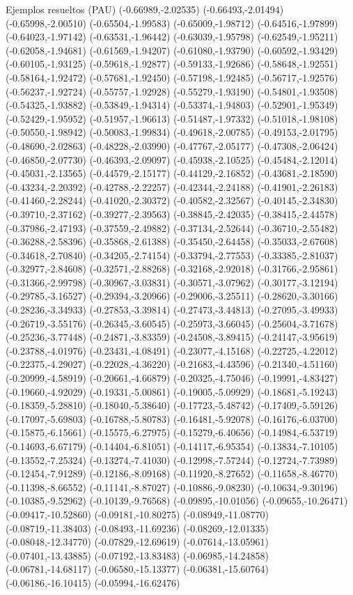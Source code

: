 \documentclass[11pt,a4paper]{article}
\begin{document}
\begin{fmex}{Ejemplos resueltos (PAU)}
(-0.66989,-2.02535) (-0.66493,-2.01494) (-0.65998,-2.00510) (-0.65504,-1.99583) (-0.65009,-1.98712) (-0.64516,-1.97899) (-0.64023,-1.97142) (-0.63531,-1.96442) (-0.63039,-1.95798) (-0.62549,-1.95211) (-0.62058,-1.94681) (-0.61569,-1.94207) (-0.61080,-1.93790) (-0.60592,-1.93429) (-0.60105,-1.93125) (-0.59618,-1.92877) (-0.59133,-1.92686) (-0.58648,-1.92551) (-0.58164,-1.92472) (-0.57681,-1.92450) (-0.57198,-1.92485) (-0.56717,-1.92576) (-0.56237,-1.92724) (-0.55757,-1.92928) (-0.55279,-1.93190) (-0.54801,-1.93508) (-0.54325,-1.93882) (-0.53849,-1.94314) (-0.53374,-1.94803) (-0.52901,-1.95349) (-0.52429,-1.95952) (-0.51957,-1.96613) (-0.51487,-1.97332) (-0.51018,-1.98108) (-0.50550,-1.98942) (-0.50083,-1.99834) (-0.49618,-2.00785) (-0.49153,-2.01795) (-0.48690,-2.02863) (-0.48228,-2.03990) (-0.47767,-2.05177) (-0.47308,-2.06424) (-0.46850,-2.07730) (-0.46393,-2.09097) (-0.45938,-2.10525) (-0.45484,-2.12014) (-0.45031,-2.13565) (-0.44579,-2.15177) (-0.44129,-2.16852) (-0.43681,-2.18590) (-0.43234,-2.20392) (-0.42788,-2.22257) (-0.42344,-2.24188) (-0.41901,-2.26183) (-0.41460,-2.28244) (-0.41020,-2.30372) (-0.40582,-2.32567) (-0.40145,-2.34830) (-0.39710,-2.37162) (-0.39277,-2.39563) (-0.38845,-2.42035) (-0.38415,-2.44578) (-0.37986,-2.47193) (-0.37559,-2.49882) (-0.37134,-2.52644) (-0.36710,-2.55482) (-0.36288,-2.58396) (-0.35868,-2.61388) (-0.35450,-2.64458) (-0.35033,-2.67608) (-0.34618,-2.70840) (-0.34205,-2.74154) (-0.33794,-2.77553) (-0.33385,-2.81037) (-0.32977,-2.84608) (-0.32571,-2.88268) (-0.32168,-2.92018) (-0.31766,-2.95861) (-0.31366,-2.99798) (-0.30967,-3.03831) (-0.30571,-3.07962) (-0.30177,-3.12194) (-0.29785,-3.16527) (-0.29394,-3.20966) (-0.29006,-3.25511) (-0.28620,-3.30166) (-0.28236,-3.34933) (-0.27853,-3.39814) (-0.27473,-3.44813) (-0.27095,-3.49933) (-0.26719,-3.55176) (-0.26345,-3.60545) (-0.25973,-3.66045) (-0.25604,-3.71678) (-0.25236,-3.77448) (-0.24871,-3.83359) (-0.24508,-3.89415) (-0.24147,-3.95619) (-0.23788,-4.01976) (-0.23431,-4.08491) (-0.23077,-4.15168) (-0.22725,-4.22012) (-0.22375,-4.29027) (-0.22028,-4.36220) (-0.21683,-4.43596) (-0.21340,-4.51160) (-0.20999,-4.58919) (-0.20661,-4.66879) (-0.20325,-4.75046) (-0.19991,-4.83427) (-0.19660,-4.92029) (-0.19331,-5.00861) (-0.19005,-5.09929) (-0.18681,-5.19243) (-0.18359,-5.28810) (-0.18040,-5.38640) (-0.17723,-5.48742) (-0.17409,-5.59126) (-0.17097,-5.69803) (-0.16788,-5.80783) (-0.16481,-5.92078) (-0.16176,-6.03700) (-0.15875,-6.15661) (-0.15575,-6.27975) (-0.15279,-6.40656) (-0.14984,-6.53719) (-0.14693,-6.67179) (-0.14404,-6.81051) (-0.14117,-6.95354) (-0.13834,-7.10105) (-0.13552,-7.25324) (-0.13274,-7.41030) (-0.12998,-7.57244) (-0.12724,-7.73989) (-0.12454,-7.91289) (-0.12186,-8.09168) (-0.11920,-8.27652) (-0.11658,-8.46770) (-0.11398,-8.66552) (-0.11141,-8.87027) (-0.10886,-9.08230) (-0.10634,-9.30196) (-0.10385,-9.52962) (-0.10139,-9.76568) (-0.09895,-10.01056) (-0.09655,-10.26471) (-0.09417,-10.52860) (-0.09181,-10.80275) (-0.08949,-11.08770) (-0.08719,-11.38403) (-0.08493,-11.69236) (-0.08269,-12.01335) (-0.08048,-12.34770) (-0.07829,-12.69619) (-0.07614,-13.05961) (-0.07401,-13.43885) (-0.07192,-13.83483) (-0.06985,-14.24858) (-0.06781,-14.68117) (-0.06580,-15.13377) (-0.06381,-15.60764) (-0.06186,-16.10415) (-0.05994,-16.62476) 
\end{fmex}
\end{document}
